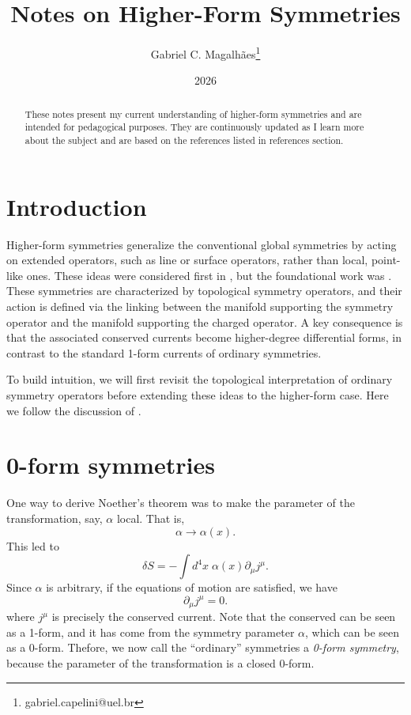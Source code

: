 \documentclass{article}
\title{Notes on Higher-Form Symmetries}
\author{Gabriel C. Magalhães\footnote{gabriel.capelini@uel.br}}
\date{2026}
\begin{document}
\maketitle

\begin{abstract}
These notes present  my current understanding of higher-form symmetries and are intended for pedagogical purposes. They are continuously updated as I learn more about the subject and are based on the references listed in references section.
\end{abstract}

\tableofcontents
\pagebreak

\section{Introduction}
Higher-form symmetries generalize the conventional global symmetries by acting on extended operators, such as line or surface operators, rather than local, point-like ones. These ideas were considered first in \cite{Kapustin_2014}, but the foundational work was \cite{gaiotto_generalized_2015}. These symmetries are characterized by topological symmetry operators, and their action is defined via the linking between the manifold supporting the symmetry operator and the manifold supporting the charged operator. A key consequence is that the associated conserved currents become higher-degree differential forms, in contrast to the standard 1-form currents of ordinary symmetries.

To build intuition, we will first revisit the topological interpretation of ordinary symmetry operators before extending these ideas to the higher-form case. Here we follow the discussion of \cite{gomes_introduction_2023,bhardwaj_lectures_2024, tong_gauge_nodate,brennan_introduction_2023}.


\section{0-form symmetries}
One way to derive Noether's theorem was to make the parameter of the transformation, say, $\alpha$ local. That is, 
\begin{equation*}
	\alpha\to\alpha(x).
\end{equation*}
This led to 
\begin{equation}\label{0 form variation}
	\delta S=-\int d^4x\;\alpha(x)\partial_\mu j^\mu.
\end{equation}
Since $\alpha$ is arbitrary, if the equations of motion are satisfied, we have
\begin{equation}
	\partial_\mu j^\mu=0.
\end{equation} 
where $j^\mu$ is precisely the conserved current. Note that the conserved can be seen as a 1-form, and it has come from the symmetry parameter $\alpha$, which can be seen as a 0-form. Thefore, we now call the ``ordinary'' symmetries a \textit{0-form symmetry}, because the parameter of the transformation is a closed 0-form.
\end{document}
